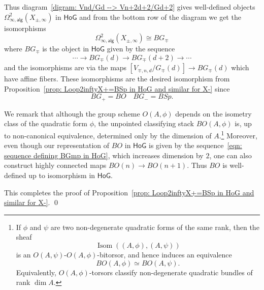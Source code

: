 \message{ !name(Bryan-Vakil.tex)}\documentclass{amsart}
\theoremstyle{definition}
\newcommand{\kk} {{\mathbbm k}}
\newcommand{\HoG}{\textsf{HoG}}
\newcommand{\Isom}{\operatorname{Isom}}
\newcommand{\alg}{\mathsf{alg}}
\begin{document}
Thus diagram~\eqref{digram: Vnd/Gd --> Vn+2d+2/Gd+2} gives
well-defined objects $\Omega^{2}_{\infty ,\alg }(X_{\pm 
,\infty})$ in $\HoG$ and from the bottom row of the diagram we get the
isomorphisms
\[
\Omega^{2}_{\infty ,\alg }(X_{\pm,\infty}) \cong BG_{\mp} 
\]
where $BG_{\mp}$ is the object in $\HoG$ given by the sequence
\begin{equation}\label{eqn: sequence defining BGmp in HoG}
\dotsb \to BG_{\mp}(d)\to BG_{\mp}(d+2) \to \dotsb 
\end{equation}
and the isomorphisms are via the maps $\left[V_{\mp ,n,d}/G_{\mp}(d)
\right]\to BG_{\mp}(d)$ which have affine fibers. These isomorphisms
are the desired isomorphism from Proposition~\ref{prop:
Loop2inftyX+=BSp in HoG and similar for X-} since
\[
BG_{+}=BO \quad  BG_{-}=BSp.
\]

We remark that although the group scheme $O(A,\phi)$ depends on the
isometry class of the quadratic form $\phi$, the unpointed
classifying stack $BO(A,\phi)$ is, up to non-canonical equivalence,
determined only by the dimension of $A$.\footnote{If $\phi$ and $\psi$ are two
non-degenerate quadratic forms of the same rank, then the sheaf
\[
\Isom((A,\phi),(A,\psi))
\]
is an $O(A,\psi)$-$O(A,\phi)$-bitorsor, and hence induces an
equivalence
\[
BO(A,\phi)\simeq BO(A,\psi).
\]
Equivalently, $O(A,\phi)$-torsors classify non-degenerate quadratic
bundles of rank $\dim A$.}
Moreover, even though our representation of $BO$ in $\HoG$ is given
by the sequence~\eqref{eqn: sequence defining BGmp in HoG}, which
increases dimension by $2$, one can also construct highly connected
maps $BO(n)\to BO(n+1)$. Thus $BO$ is well-defined up to isomorphism
in $\HoG$.

This completes the proof of Proposition~\ref{prop: Loop2inftyX+=BSp in
HoG and similar for X-}. \qed 

       


\end{document}
